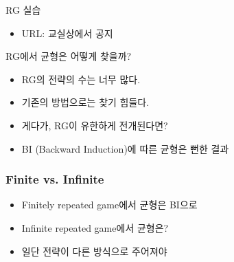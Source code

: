 \documentclass[final]{beamer}
\begin{document}
\begin{frame}[t]{RG 실습}
	\begin{itemize}
		\item URL: 교실상에서 공지
	\end{itemize}
\end{frame}

\begin{frame}[t]{RG에서 균형은 어떻게 찾을까?}
	\begin{itemize}
		\item RG의 전략의 수는 너무 많다. 
		\item 기존의 방법으로는 찾기 힘들다. 
		\item 게다가, RG이 유한하게 전개된다면?
		\item BI (Backward Induction)에 따른 균형은 뻔한 결과 
	\end{itemize}
\end{frame}

\begin{frame}\frametitle{Finite vs. Infinite}\vspace{3.5em}
\begin{itemize}
	\item Finitely repeated game에서 균형은 BI으로 
	\item Infinite repeated game에서 균형은? 
	\item 일단 전략이 다른 방식으로 주어져야 
\end{itemize}
\end{frame}
\end{document}
